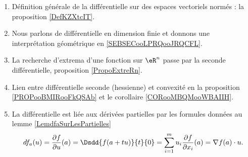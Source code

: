 \begin{enumerate}
    \item
        Définition générale de la différentielle sur des espaces vectoriels normés : la proposition \ref{DefKZXtcIT}.
    \item
        Nous parlons de différentielle en dimension finie et donnons une interprétation géométrique en \ref{SEBSECooLPRQooJRQCFL}.
    \item
        La recherche d'extrema d'une fonction sur \( \eR^n\) passe par la seconde différentielle, proposition \ref{PropoExtreRn}.
    \item
        Lien entre différentielle seconde (hessienne) et convexité en la proposition \ref{PROPooBMIRooFkQSAb} et le corollaire \ref{CORooMBQMooWBAIIH}.
    \item
        La différentielle est liée aux dérivées partielles par les formules données au lemme \ref{LemdfaSurLesPartielles}
	\begin{equation}
        df_a(u)=\frac{ \partial f }{ \partial u }(a)=\Dsdd{ f(a+tu) }{t}{0}=\sum_{i=1}^mu_i\frac{ \partial f }{ \partial x_i }(a)=\nabla f(a)\cdot u.
	\end{equation}
\end{enumerate}
